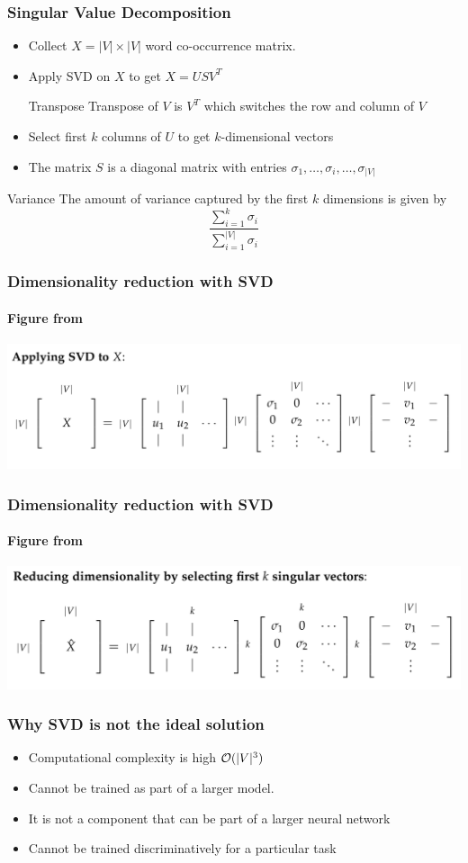 \begin{frame}
\frametitle{Singular Value Decomposition}
\begin{itemize}[<+->]
\item Collect $X = |V| \times |V|$ word co-occurrence matrix.
\item Apply SVD on $X$ to get $X = U S V^T$
\pause
\begin{block}{Transpose}
Transpose of $V$ is $V^T$ which switches the row and column of $V$
\end{block}
\item Select first $k$ columns of $U$ to get $k$-dimensional vectors
\item The matrix $S$ is a diagonal matrix with entries $\sigma_1, \ldots, \sigma_i, \ldots, \sigma_{|V|}$
\end{itemize}
\pause 
\begin{alertblock}{Variance}
The amount of variance captured by the first $k$ dimensions is given by
\[ \frac{\sum_{i=1}^k \sigma_i}{\sum_{i=1}^{|V|} \sigma_i} \]\end{alertblock}
\end{frame}

\begin{frame}
\frametitle{Dimensionality reduction with SVD}
\framesubtitle{Figure from \cite{cs224n}}
\includegraphics[scale=.38]{figures/wordvectors/svdapply}	
\end{frame}

\begin{frame}
\frametitle{Dimensionality reduction with SVD}
\framesubtitle{Figure from \cite{cs224n}}
\includegraphics[scale=.38]{figures/wordvectors/reducedim}	
\end{frame}

\begin{frame}
\frametitle{Why SVD is not the ideal solution}
\begin{itemize}[<+->]
	\item Computational complexity is high ${\cal O}(|V|^3)$
	\item Cannot be trained as part of a larger model. 
	\item It is not a component that can be part of a larger neural network
	\item Cannot be trained discriminatively for a particular task
\end{itemize}
\end{frame}

